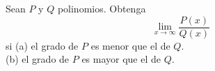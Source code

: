 \item Sean $P$ y $Q$ polinomios. Obtenga 
    $$\lim_{x \to \infty} \frac{P(x)}{Q(x)}$$
    si (a) el grado de $P$ es menor que el de $Q$.\\
    (b) el grado de $P$ es mayor que el de $Q$.
